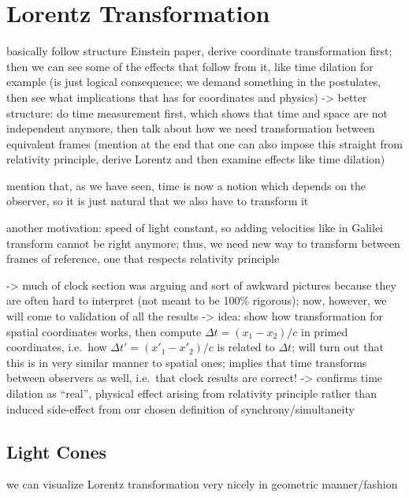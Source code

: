 	\section{Lorentz Transformation}
basically follow structure Einstein paper, derive coordinate transformation first; then we can see some of the effects that follow from it, like time dilation for example (is just logical consequence; we demand something in the postulates, then see what implications that has for coordinates and physics) -> better structure: do time measurement first, which shows that time and space are not independent anymore, then talk about how we need transformation between equivalent frames (mention at the end that one can also impose this straight from relativity principle, derive Lorentz and then examine effects like time dilation)


mention that, as we have seen, time is now a notion which depends on the observer, so it is just natural that we also have to transform it


another motivation: speed of light constant, so adding velocities like in Galilei transform cannot be right anymore; thus, we need new way to transform between frames of reference, one that respects relativity principle


-> much of clock section was arguing and sort of awkward pictures because they are often hard to interpret (not meant to be 100\% rigorous); now, however, we will come to validation of all the results -> idea: show how transformation for spatial coordinates works, then compute $\Delta t = (x_1 - x_2) / c$ in primed coordinates, i.e.~how $\Delta t' = (x'_1 - x'_2) / c$ is related to $\Delta t$; will turn out that this is in very similar manner to spatial ones; implies that time transforms between observers as well, i.e.~that clock results are correct! -> confirms time dilation as \enquote{real}, physical effect arising from relativity principle rather than induced side-effect from our chosen definition of synchrony/simultaneity



		\subsection{Light Cones}
we can visualize Lorentz transformation very nicely in geometric manner/fashion


